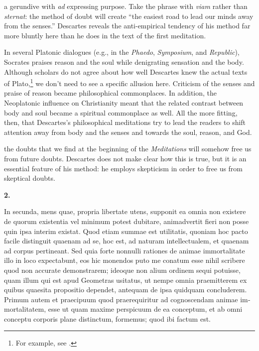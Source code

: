  a gerundive with \textit{ad} expressing purpose. Take the phrase with \textit{viam} rather than \textit{sternat}: the method of doubt will create ``the easiest road to lead our minds away from the senses.'' Descartes reveals the anti-empirical tendency of his method far more bluntly here than he does in the text of the first meditation.

In several Platonic dialogues (e.g., in the \textit{Phaedo}, \textit{Symposium}, and \textit{Republic}), Socrates praises reason and the soul while denigrating sensation and the body. Although scholars do not agree about how well Descartes knew the actual texts of Plato,\footnote{For example, see \textcite[556, especially note 11]{grene1999}.} we don't need to see a specific allusion here. Criticism of the senses and praise of reason became philosophical commonplaces. In addition, the Neoplatonic influence on Christianity meant that the related contrast between body and soul became a spiritual commonplace as well. All the more fitting, then, that Descartes's philosophical meditations try to lead the readers to shift attention away from body and the senses and towards the soul, reason, and God.

 the doubts that we find at the beginning of the \textit{Meditations} will somehow free us from future doubts. Descartes does not make clear how this is true, but it is an essential feature of his method: he employs skepticism in order to free us from skeptical doubts.


\clearpage

\beginnumbering
\pstart
\textbf{2.} \begin{latin}In secunda, mens quae, propria libertate utens, supponit ea omnia non existere de quorum existentia vel minimum potest dubitare, animadvertit fieri non posse quin ipsa interim existat. Quod etiam summae est utilitatis, quoniam hoc pacto facile distinguit quaenam ad se, hoc est, ad naturam intellectualem, et quaenam ad corpus pertineant. Sed quia forte nonnulli rationes de animae immortalitate illo in loco expectabunt, eos hic monendos  puto me conatum esse nihil scribere quod non accurate demonstrarem; ideoque non alium ordinem sequi potuisse, quam illum qui est apud Geometras usitatus, ut nempe omnia praemitterem ex quibus quaesita propositio dependet, antequam de ipsa quidquam concluderem. Primum autem et praecipuum quod praerequiritur ad cognoscendam animae immortalitatem, esse ut quam maxime perspicuum de ea conceptum, et ab omni conceptu corporis plane distinctum, formemus; quod ibi factum est.\end{latin}
\pend
\endnumbering

